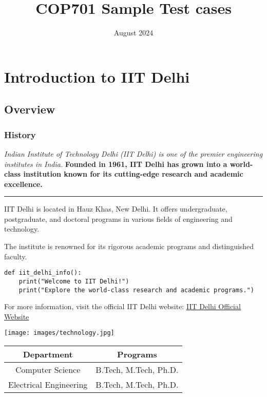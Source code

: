 \documentclass{article}
\title{COP701 Sample Test cases}
\date{August 2024}
\begin{document}
\section{Introduction to IIT Delhi}
\subsection{Overview}
\subsubsection{History}

\textit{Indian Institute of Technology Delhi (IIT Delhi) is one of the premier engineering institutes in India.}
\textbf{Founded in 1961, IIT Delhi has grown into a world-class institution known for its cutting-edge research and academic excellence.}

\hrule

IIT Delhi is located in Hauz Khas, New Delhi. It offers undergraduate, postgraduate, and doctoral programs in various fields of engineering and technology.\par
The institute is renowned for its rigorous academic programs and distinguished faculty.

\begin{verbatim}
def iit_delhi_info():
    print("Welcome to IIT Delhi!")
    print("Explore the world-class research and academic programs.")
\end{verbatim}

For more information, visit the official IIT Delhi website: \href{https://www.iitd.ac.in}{IIT Delhi Official Website}

\texttt{[image: images/technology.jpg]}

\begin{tabular}{|c|c|}
\hline
Department & Programs \\
\hline
Computer Science & B.Tech, M.Tech, Ph.D. \\
Electrical Engineering & B.Tech, M.Tech, Ph.D. \\
\hline
\end{tabular}
\end{document}
